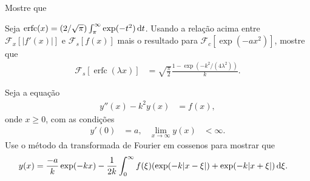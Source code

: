 \documentclass[a4paper,12pt, leqno, answers]{exam}
\DeclareMathOperator{\erfc}{erfc}
\begin{document}
\begin{questions}
    \question Mostre que

    \question Seja $\erfc(x) = \left( 2 / \sqrt{\pi} \right) \int_\pi^\infty
    \exp(-t^2) \id{t}$. Usando a rela\c{c}\~{a}o acima entre
    $\mathcal{F}_x\left[ |f'(x)| \right]$ e $\mathcal{F}_s\left[ f(x)
    \right]$ mais o resultado para $\mathcal{F}_c\left[ \exp\left( -a x^2
    \right) \right]$, mostre que
    \begin{align*}
        \mathcal{F}_s\left[ \erfc(\lambda x) \right] &= \sqrt{\frac{\pi}{2}}
        \frac{1 - \exp\left( -k^2 / \left( 4 \lambda^2 \right) \right)}{k}.
    \end{align*}
    \begin{solution}
    \end{solution}
    
    \question Seja a equa\c{c}\~{a}o
    \begin{align*}
        y''(x) - k^2 y(x) &= f(x),
    \end{align*}
    onde $x \geq 0$, com as condi\c{c}\~{o}es
    \begin{align*}
        y'(0) &= a, & \lim_{x \to \infty} y(x) &< \infty.
    \end{align*}
    Use o m\'{e}todo da transformada de Fourier em cossenos para mostrar que
    \begin{align*}
        y(x) &= \frac{-a}{k} \exp(-k x) - \frac{1}{2k} \int_0^\infty f(\xi)
        (\exp(-k |x - \xi|) + \exp(-k | x + \xi|) \, \mathrm{d}\xi.
    \end{align*}
    \begin{solution}
    \end{solution}


\end{questions}
\end{document}
